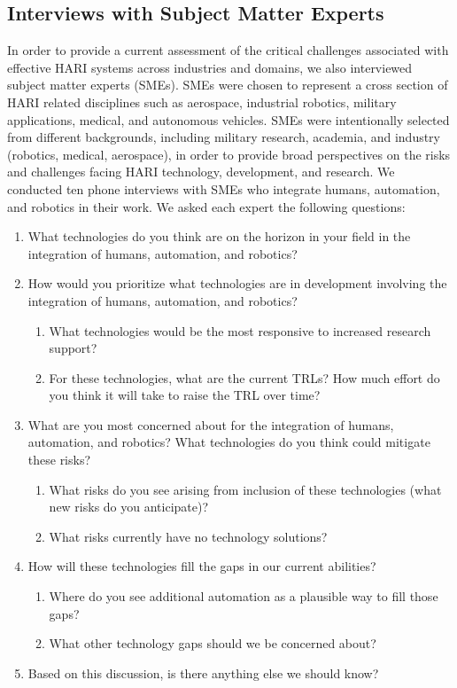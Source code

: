 \subsection{Interviews with Subject Matter Experts}
In order to provide a current assessment of the critical challenges associated with effective HARI systems across industries and domains, we also interviewed subject matter experts (SMEs).
SMEs were chosen to represent a cross section of HARI related disciplines such as aerospace, industrial robotics, military applications, medical, and autonomous vehicles.
SMEs were intentionally selected from different backgrounds, including military research, academia, and industry (robotics, medical, aerospace), in order to provide broad perspectives on the risks and challenges facing HARI technology, development, and research.
We conducted ten phone interviews with SMEs who integrate humans, automation, and robotics in their work.
We asked each expert the following questions:
\begin{enumerate}
    \item What technologies do you think are on the horizon in your field in the integration of humans, automation, and robotics?
    \item How would you prioritize what technologies are in development involving the integration of humans, automation, and robotics?
          \begin{enumerate}
              \item What technologies would be the most responsive to increased research support?
              \item For these technologies, what are the current TRLs? How much effort do you think it will take to raise the TRL over time?
          \end{enumerate}
    \item What are you most concerned about for the integration of humans, automation, and robotics? What technologies do you think could mitigate these risks?
          \begin{enumerate}
              \item What risks do you see arising from inclusion of these technologies (what new risks do you anticipate)?
              \item What risks currently have no technology solutions?
          \end{enumerate}
    \item How will these technologies fill the gaps in our current abilities?
          \begin{enumerate}
              \item Where do you see additional automation as a plausible way to fill those gaps?
              \item What other technology gaps should we be concerned about?
          \end{enumerate}
    \item Based on this discussion, is there anything else we should know?
\end{enumerate}

